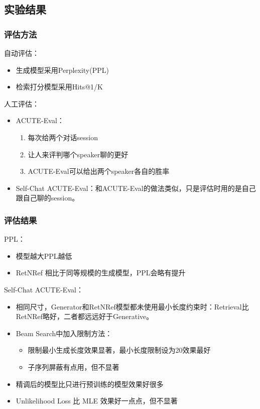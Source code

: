 \documentclass{beamer}
\begin{document}
\subsection{实验结果}
\begin{frame}
    \frametitle{评估方法}

    自动评估：

    \begin{itemize}
        \item 生成模型采用Perplexity(PPL)
        \item 检索打分模型采用Hits@1/K
    \end{itemize}

    人工评估：

    \begin{itemize}
        \item ACUTE-Eval：
        \begin{enumerate}
            \item 每次给两个对话session
            \item 让人来评判哪个speaker聊的更好
            \item ACUTE-Eval可以给出两个speaker各自的胜率
        \end{enumerate}
        \item Self-Chat ACUTE-Eval：和ACUTE-Eval的做法类似，只是评估时用的是自己跟自己聊的session。
    \end{itemize}

\end{frame}

\begin{frame}
    \frametitle{评估结果}

    PPL：

    \begin{itemize}
        \item 模型越大PPL越低
        \item RetNRef 相比于同等规模的生成模型，PPL会略有提升
    \end{itemize}

    Self-Chat ACUTE-Eval：

    \begin{itemize}
        \item 相同尺寸，Generator和RetNRef模型都未使用最小长度约束时：Retrieval比RetNRef略好，二者都远远好于Generative。
        \item Beam Search中加入限制方法：
        \begin{itemize}
            \item 限制最小生成长度效果显著，最小长度限制设为20效果最好
            \item 子序列屏蔽有点用，但不显著
        \end{itemize}
        \item 精调后的模型比只进行预训练的模型效果好很多
        \item Unlikelihood Loss 比 MLE 效果好一点点，但不显著
    \end{itemize}

\end{frame}
\end{document}
